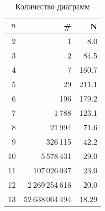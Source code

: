 \documentclass[a4paper,12pt]{article}
\theoremstyle{plain}
\theoremstyle{definition}
\begin{document}
\begin{table}[!t]\footnotesize
\caption{\small Количество диаграмм\label{table:total-count}} \centering
\begin{tabular}{|r||r|r|}
\hline
$n$ & \# & N \\
\hline\hline
 2 &                 1 &   8.0 \\
 3 &                 2 &  84.5 \\
 4 &                 7 & 160.7 \\
 5 &                29 & 211.1 \\
 6 &               196 & 179.2 \\
 7 &            1\,788 & 123.1 \\
 8 &           21\,994 &  71.6 \\
 9 &          326\,115 &  42.2 \\
10 &       5\,578\,431 &  29.0 \\
11 &     107\,026\,037 &  23.0 \\
12 &  2\,269\,254\,616 &  20.0 \\
13 & 52\,638\,064\,494 & 18.29 \\
\hline
\end{tabular}
\end{table}
\end{document}
